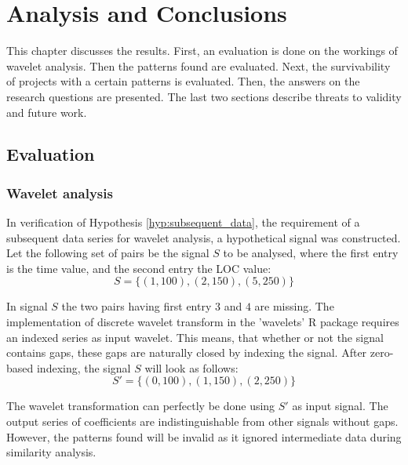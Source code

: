 \chapter{Analysis and Conclusions}
\label{analysis}

This chapter discusses the results. First, an evaluation is done on the workings
of wavelet analysis. Then the patterns found are evaluated. Next, the
survivability of projects with a certain patterns is evaluated. Then, the
answers on the research questions are presented. The last two sections describe
threats to validity and future work.

\section{Evaluation}
\subsection{Wavelet analysis}
\label{section:gapless_wavelets}
In verification of Hypothesis \ref{hyp:subsequent_data}, the requirement of a
subsequent data series for wavelet analysis, a hypothetical signal was
constructed. Let the following set of pairs be the signal $S$ to be analysed,
where the first entry is the time value, and the second entry the LOC value:
$$S = \{(1,100), (2,150), (5,250)\}$$

\noindent
In signal $S$ the two pairs having first entry $3$ and $4$ are missing. The
implementation of discrete wavelet transform in the 'wavelets' R package
requires an indexed series as input wavelet. This means, that whether or not
the signal contains gaps, these gaps are naturally closed by indexing the
signal. After zero-based indexing, the signal $S$ will look as follows:
$$S' = \{(0,100), (1,150), (2,250)\}$$

\noindent
The wavelet transformation can perfectly be done using $S'$ as input
signal. The output series of coefficients are indistinguishable from other
signals without gaps. However, the patterns found will be invalid as it ignored
intermediate data during similarity analysis.

